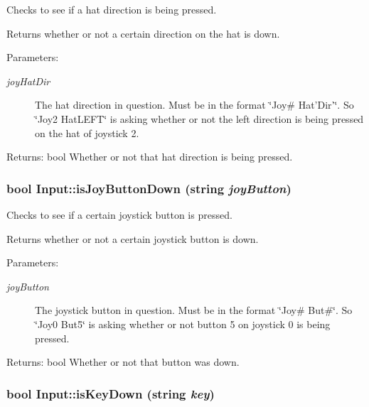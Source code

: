 Checks to see if a hat direction is being pressed. 

Returns whether or not a certain direction on the hat is down. \begin{Desc}
\item[Parameters:]
\begin{description}
\item[{\em joyHatDir}]The hat direction in question. Must be in the format \char`\"{}Joy\# Hat'Dir'\char`\"{}. So \char`\"{}Joy2 HatLEFT\char`\"{} is asking whether or not the left direction is being pressed on the hat of joystick 2. \end{description}
\end{Desc}
\begin{Desc}
\item[Returns:]bool Whether or not that hat direction is being pressed. \end{Desc}
\hypertarget{class_input_2ee1202f91bb6461a0d97788cd6b4ba7}{
\subsubsection[{isJoyButtonDown}]{\setlength{\rightskip}{0pt plus 5cm}bool Input::isJoyButtonDown (string {\em joyButton})}}
\label{class_input_2ee1202f91bb6461a0d97788cd6b4ba7}


Checks to see if a certain joystick button is pressed. 

Returns whether or not a certain joystick button is down. \begin{Desc}
\item[Parameters:]
\begin{description}
\item[{\em joyButton}]The joystick button in question. Must be in the format \char`\"{}Joy\# But\#\char`\"{}. So \char`\"{}Joy0 But5\char`\"{} is asking whether or not button 5 on joystick 0 is being pressed. \end{description}
\end{Desc}
\begin{Desc}
\item[Returns:]bool Whether or not that button was down. \end{Desc}
\hypertarget{class_input_9d9675172f386bb34e1742a6b3abdb69}{
\subsubsection[{isKeyDown}]{\setlength{\rightskip}{0pt plus 5cm}bool Input::isKeyDown (string {\em key})}}
\label{class_input_9d9675172f386bb34e1742a6b3abdb69}


